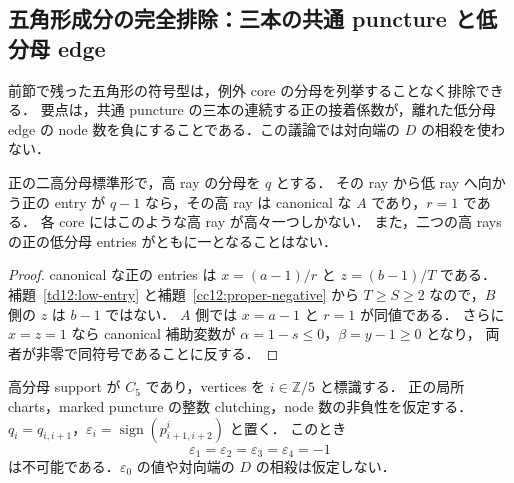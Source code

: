 
\subsection{五角形成分の完全排除：三本の共通 puncture と低分母 edge}
\label{cf13:section}

前節で残った五角形の符号型は，例外 core の分母を列挙することなく排除できる．
要点は，共通 puncture の三本の連続する正の接着係数が，離れた低分母 edge の
node 数を負にすることである．この議論では対向端の $D$ の相殺を使わない．

\begin{lemma}
\label{cf13:full-entry}
正の二高分母標準形で，高 ray の分母を $q$ とする．
その ray から低 ray へ向かう正の entry が $q-1$ なら，その高 ray は
canonical な $A$ であり，$r=1$ である．
各 core にはこのような高 ray が高々一つしかない．
また，二つの高 rays の正の低分母 entries がともに一となることはない．
\end{lemma}

\begin{proof}
canonical な正の entries は $x=(a-1)/r$ と $z=(b-1)/T$ である．
補題~\ref{td12:low-entry} と補題~\ref{cc12:proper-negative} から
$T\geq S\geq2$ なので，$B$ 側の $z$ は $b-1$ ではない．
$A$ 側では $x=a-1$ と $r=1$ が同値である．
さらに $x=z=1$ なら canonical 補助変数が
$\alpha=1-s\leq0$，$\beta=y-1\geq0$ となり，
両者が非零で同符号であることに反する．
\end{proof}

\begin{lemma}
\label{cf13:four-negative}
高分母 support が $C_5$ であり，vertices を $i\in\mathbb Z/5$ と標識する．
正の局所 charts，marked puncture の整数 clutching，node 数の非負性を仮定する．
$q_i=q_{i,i+1}$，$\varepsilon_i=\operatorname{sign}(p^i_{i+1,i+2})$ と置く．
このとき
\[
 \varepsilon_1=\varepsilon_2=\varepsilon_3=\varepsilon_4=-1
\]
は不可能である．$\varepsilon_0$ の値や対向端の $D$ の相殺は仮定しない．
\end{lemma}

